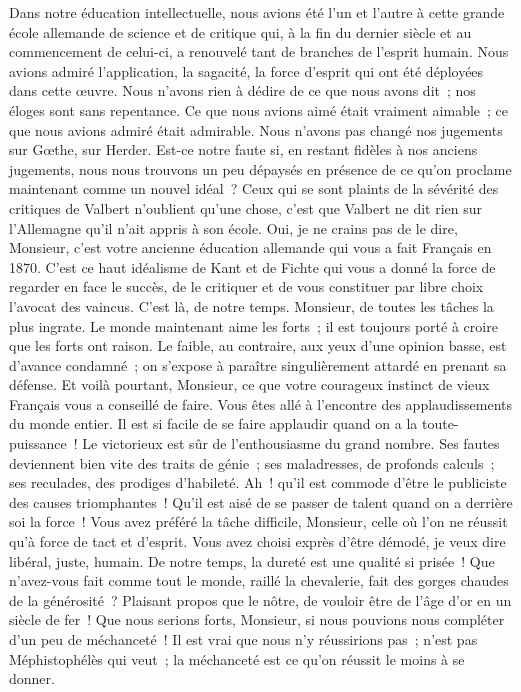 \documentclass[french,twoside]{book} %
\newcommand\orgName[1]{#1}
\newcommand\persName[1]{#1}
\begin{document}
Dans notre éducation intellectuelle, nous avions été l’un et l’autre à cette grande école allemande de science et de critique qui, à la fin du dernier siècle et au commencement de celui-ci, a renouvelé tant de branches de l’esprit humain. Nous avions admiré l’application, la sagacité, la force d’esprit qui ont été déployées dans cette œuvre. Nous n’avons rien à dédire de ce que nous avons dit ; nos éloges sont sans repentance. Ce que nous avions aimé était vraiment aimable ; ce que nous avions admiré était admirable. Nous n’avons pas changé nos jugements sur {\persName Gœthe}, sur {\persName Herder}. Est-ce notre faute si, en restant fidèles à nos anciens jugements, nous nous trouvons un peu dépaysés en présence de ce qu’on proclame maintenant comme un nouvel idéal ? Ceux qui se sont plaints de la sévérité des critiques de {\persName Valbert} n’oublient qu’une chose, c’est que {\persName Valbert} ne dit rien sur l’{\orgName Allemagne} qu’il n’ait appris à son école. Oui, je ne crains pas de le dire, Monsieur, c’est votre ancienne éducation allemande qui vous a fait Français en 1870. C’est ce haut idéalisme de {\persName Kant} et de {\persName Fichte} qui vous a donné la force de regarder en face le succès, de le critiquer et de vous constituer par libre choix l’avocat des vaincus. C’est là, de notre temps. Monsieur, de toutes les tâches la plus ingrate. Le monde maintenant aime les forts ; il est toujours porté à croire que les forts ont raison. Le faible, au contraire, aux yeux d’une opinion basse, est d’avance condamné ; on s’expose à paraître singulièrement attardé en prenant sa défense. Et voilà pourtant, Monsieur, ce que votre courageux instinct de vieux Français vous a conseillé de faire. Vous êtes allé à l’encontre des applaudissements du monde entier. Il est si facile de se faire applaudir quand on a la toute-puissance ! Le victorieux est sûr de l’enthousiasme du grand nombre. Ses fautes deviennent bien vite des traits de génie ; ses maladresses, de profonds calculs ; ses reculades, des prodiges d’habileté. Ah ! qu’il est commode d’être le publiciste des causes triomphantes ! Qu’il est aisé de se passer de talent quand on a derrière soi la force ! Vous avez préféré la tâche difficile, Monsieur, celle où l’on ne réussit qu’à force de tact et d’esprit. Vous avez choisi exprès d’être démodé, je veux dire libéral, juste, humain. De notre temps, la dureté est une qualité si prisée ! Que n’avez-vous fait comme tout le monde, raillé la chevalerie, fait des gorges chaudes de la générosité ? Plaisant propos que le nôtre, de vouloir être de l’âge d’or en un siècle de fer ! Que nous serions forts, Monsieur, si nous pouvions nous compléter d’un peu de méchanceté ! Il est vrai que nous n’y réussirions pas ; n’est pas {\persName Méphistophélès} qui veut ; la méchanceté est ce qu’on réussit le moins à se donner.\par
\end{document}
